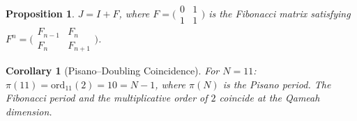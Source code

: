 \documentclass[aps,prd,twocolumn,superscriptaddress,floatfix,nofootinbib]{revtex4-2}
\newtheorem{corollary}[theorem]{Corollary}
\newtheorem{proposition}[theorem]{Proposition}
\theoremstyle{definition}
\theoremstyle{remark}
\begin{document}
\begin{proposition}
$J = I + F$, where $F = \bigl(\begin{smallmatrix} 0 & 1 \\ 1 & 1 \end{smallmatrix}\bigr)$
is the Fibonacci matrix satisfying $F^n = \bigl(\begin{smallmatrix} F_{n-1} & F_n \\ F_n & F_{n+1} \end{smallmatrix}\bigr)$.
\end{proposition}

\begin{corollary}[Pisano--Doubling Coincidence]
For $N = 11$: $\pi(11) = \mathrm{ord}_{11}(2) = 10 = N-1$,
where $\pi(N)$ is the Pisano period. The Fibonacci period and the
multiplicative order of $2$ coincide at the Qameah dimension.
\end{corollary}
\end{document}
